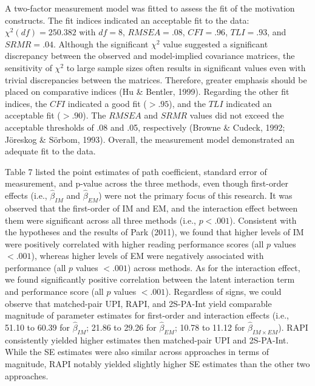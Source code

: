 \documentclass[
  man]{apa6}
\begin{document}
A two-factor measurement model was fitted to assess the fit of the motivation constructs. The fit indices indicated an acceptable fit to the data: \(\chi^2(df) = 250.382\) with \(\textit{df} = 8\), \(RMSEA = .08\), \(CFI = .96\), \(TLI = .93\), and \(SRMR = .04\). Although the significant \(\chi^2\) value suggested a significant discrepancy between the observed and model-implied covariance matrices, the sensitivity of \(\chi^2\) to large sample sizes often results in significant values even with trivial discrepancies between the matrices. Therefore, greater emphasis should be placed on comparative indices (Hu \& Bentler, 1999). Regarding the other fit indices, the \(CFI\) indicated a good fit (\(> .95\)), and the \(TLI\) indicated an acceptable fit (\(> .90\)). The \(RMSEA\) and \(SRMR\) values did not exceed the acceptable thresholds of .08 and .05, respectively (Browne \& Cudeck, 1992; Jöreskog \& Sörbom, 1993). Overall, the measurement model demonstrated an adequate fit to the data.

Table 7 listed the point estimates of path coefficient, standard error of measurement, and p-value across the three methods, even though first-order effects (i.e., \(\hat{\beta}_{IM}\) and \(\hat{\beta}_{EM}\)) were not the primary focus of this research. It was observed that the first-order of IM and EM, and the interaction effect between them were significant across all three methods (i.e., \(\textit{p} < .001\)). Consistent with the hypotheses and the results of Park (2011), we found that higher levels of IM were positively correlated with higher reading performance scores (all \(\textit{p}\) values \(< .001\)), whereas higher levels of EM were negatively associated with performance (all \(\textit{p}\) values \(< .001\)) across methods. As for the interaction effect, we found significantly positive correlation between the latent interaction term and performance score (all \(\textit{p}\) values \(< .001\)). Regardless of signs, we could observe that matched-pair UPI, RAPI, and 2S-PA-Int yield comparable magnitude of parameter estimates for first-order and interaction effects (i.e., 51.10 to 60.39 for \(\hat{\beta}_{IM}\); 21.86 to 29.26 for \(\hat{\beta}_{EM}\); 10.78 to 11.12 for \(\hat{\beta}_{IM \times EM}\)). RAPI consistently yielded higher estimates then matched-pair UPI and 2S-PA-Int. While the SE estimates were also similar across approaches in terms of magnitude, RAPI notably yielded slightly higher SE estimates than the other two approaches.
\end{document}
